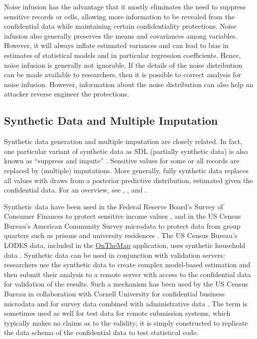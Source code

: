 Noise infusion has the advantage that it mostly eliminates the need to suppress sensitive records or cells, allowing more information to be revealed from the confidential data while maintaining certain confidentiality protections. Noise infusion also generally preserves the means and covariances among variables. However, it will always inflate estimated variances and can lead to bias in estimates of statistical models and in particular regression coefficients. Hence, noise infusion is generally not ignorable. If the details of the noise distribution can be made available to researchers, then it is possible to correct analysis for noise infusion. However, information about the noise distribution can also help an attacker reverse engineer the protections.

\hypertarget{synthetic-data-and-multiple-imputation}{%
\subsection{Synthetic Data and Multiple Imputation}\label{synthetic-data-and-multiple-imputation}}

Synthetic data generation and multiple imputation are closely related. In fact, one particular variant of synthetic data as SDL (partially synthetic data) is also known as ``suppress and impute'' \citep{little_statistical_1993}. Sensitive values for some or all records are replaced by (multiple) imputations. More generally, fully synthetic data \citep{rubin_discussion_1993} replaces all values with draws from a posterior predictive distribution, estimated given the confidential data. For an overview, see \citet{raghunathan_multiple_2003}, \citet{little_statistical_2004}, and \citet{drechsler_synthetic_2011}.

Synthetic data have been used in the Federal Reserve Board's Survey of Consumer Finances to protect sensitive income values \citep{kennickell_multiple_1998}, and in the US Census Bureau's American Community Survey microdata to protect data from group quarters such as prisons and university residences \citep{hawala_disclosure_2009}. The US Census Bureau's LODES data, included in the \href{https://onthemap.ces.census.gov/}{OnTheMap} application, uses synthetic household data \citep{machanavajjhala_privacy_2008}. Synthetic data can be used in conjunction with validation servers: researchers use the synthetic data to create complex model-based estimation and then submit their analysis to a remote server with access to the confidential data for validation of the results. Such a mechanism has been used by the US Census Bureau in collaboration with Cornell University for confidential business microdata \citep{kinney_towards_2011} and for survey data combined with administrative data \citep{abowd_final_2006}. The term is sometimes used as well for test data for remote submission systems, which typically makes no claims as to the validity; it is simply constructed to replicate the data schema of the confidential data to test statistical code.

